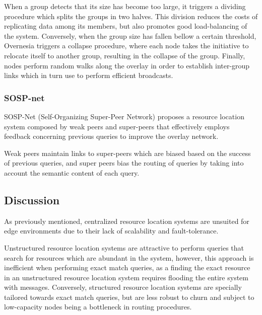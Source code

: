 When a group detects that its size has become too large, it triggers a dividing procedure which splits the groups in two halves. This division reduces the costs of replicating data among its members, but also promotes good load-balancing of the system. Conversely, when the group size has fallen bellow a certain threshold, Overnesia triggers a collapse procedure, where each node takes the initiative to relocate itself to another group, resulting in the collapse of the group. Finally, nodes perform random walks along the overlay in order to establish inter-group links which in turn use to perform efficient broadcasts.

\subsubsection*{SOSP-net}

SOSP-Net \cite{garbacki2007optimizing}  (Self-Organizing Super-Peer Network) proposes a resource location system composed by weak peers and super-peers that effectively employs feedback concerning previous queries to improve the overlay network. 

Weak peers maintain links to super-peers which are biased based on the success of previous queries, and super peers bias the routing of queries by taking into account the semantic content of each query. 

\subsection{Discussion}

As previously mentioned, centralized resource location systems are unsuited for edge environments due to their lack of scalability and fault-tolerance.

Unstructured resource location systems are attractive to perform queries that search for resources which are abundant in the system, however, this approach is inefficient when performing exact match queries, as a finding the exact resource in an unstructured resource location system requires flooding the entire system with messages. Conversely, structured resource location systems are specially tailored towards exact match queries, but are less robust to churn and subject to low-capacity nodes being a bottleneck in routing procedures. 


